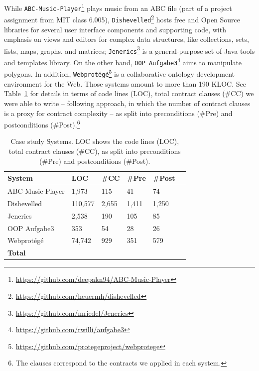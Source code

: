 While \texttt{ABC-Music-Player}\footnote{\url{https://github.com/deepakn94/ABC-Music-Player}}
plays music from an ABC file (part of a project assignment from MIT class
6.005), \texttt{Dishevelled}\footnote{\url{https://github.com/heuermh/dishevelled}} hosts
free and Open Source libraries for several user interface components and
supporting code, with emphasis on views and editors for complex data structures, like collections, sets, lists, maps, graphs, and
matrices; \texttt{Jenerics}\footnote{\url{https://github.com/mriedel/Jenerics}} is a general-purpose set of Java tools and templates library.
On the other hand, \texttt{OOP
Aufgabe3}\footnote{\url{https://github.com/rwilli/aufgabe3}} aims to manipulate
polygons. In addition,
\texttt{Webprot\'{e}g\'{e}}\footnote{\url{https://github.com/protegeproject/webprotege}}
is a collaborative ontology development environment for the Web. Those systems amount to more than 190 KLOC. See Table~\ref{tab:Units} for details in
terms of code lines (LOC), total contract clauses (\#CC) we were able to write
-- following \cite{Estler-etal14} approach, in which the number of contract clauses is a proxy for contract complexity -- as split
into preconditions (\#Pre) and postconditions (\#Post).\footnote{The clauses
correspond to the contracts we applied in each system.}

\begin{table}[ht]
\caption{Case study Systems. LOC shows the code lines (LOC), total contract clauses (\#CC), as split
into preconditions (\#Pre) and postconditions (\#Post).}
\label{tab:Units}
\centering
\begin{tabular}{llllll}
\toprule
\bfseries System &  \bfseries LOC & 
\bfseries \#CC &  \bfseries \#Pre &  \bfseries \#Post \\ \hline
ABC-Music-Player & 1,973 & 115 & 41 & 74 \\ 
Dishevelled & 110,577 & 2,655 & 1,411 & 1,250\\ 
Jenerics & 2,538 & 190 & 105 & 85 \\ 
OOP Aufgabe3 & 353 & 54 & 28 & 26 \\
Webprot\'{e}g\'{e} & 74,742 & 929 & 351 & 579 \\ \hline

 \bfseries Total &  \bfseries \totalCode{} &  \bfseries
\totalClauses{} &  \bfseries \totalPre{} &  \bfseries \totalPost{}
\\
\bottomrule
\end{tabular}
\end{table}

